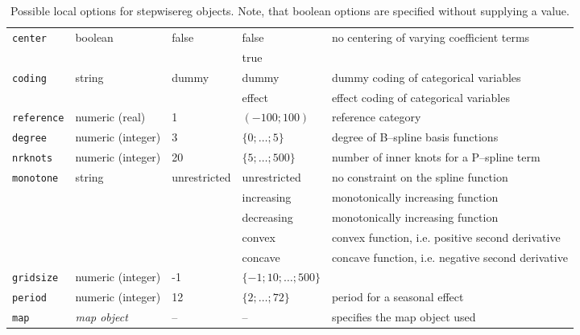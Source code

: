 \begin{sidewaystable}[ht]
\begin{center}
\begin{tabular}{|l|l|l|l|l|}
\hline
 {\tt center}    & boolean                 & false & false & no centering of varying coefficient terms \\
                 &                         &       & true  &  \\
\hline
 {\tt coding}    & string                  & dummy & dummy & dummy coding of categorical variables \\
                 &                         &       & effect & effect coding of categorical variables \\
\hline
 {\tt reference} & numeric (real)    & 1  & $(-100;100)$ & reference category \\
\hline
 {\tt degree}    & numeric (integer) & 3  & $\{0;\ldots;5\}$ & degree of B--spline basis functions \\
\hline
 {\tt nrknots}   & numeric (integer) & 20 & $\{5;\ldots;500\}$ & number of inner knots for a P--spline term \\
\hline
 {\tt monotone}  & string                  & unrestricted & unrestricted & no constraint on the spline function \\
                 &                         &              & increasing   & monotonically increasing function \\
                 &                         &              & decreasing   & monotonically increasing function \\
                 &                         &              & convex       & convex function, i.e. positive second derivative \\
                 &                         &              & concave      & concave function, i.e. negative second derivative \\
\hline
 {\tt gridsize}  & numeric (integer) & -1 & $\{-1;10;\ldots;500\}$ & \\
\hline
 {\tt period}    & numeric (integer) & 12 & $\{2;\ldots;72\}$ & period for a seasonal effect \\
\hline
 {\tt map}       & {\it map object}        & --    & --                & specifies the map object used \\
 \hline
 \end{tabular}
 {\em\caption {\label{stepwisereg_localoptions} Possible local options
 for stepwisereg objects. Note, that boolean options are specified without supplying a value.}}
 \end{center}
 \end{sidewaystable}

